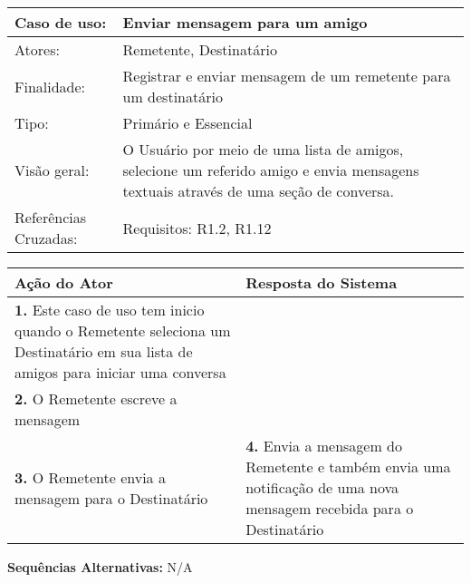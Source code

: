 \documentclass[12pt,a4paper,onecolumn,titlepage]{article}
\begin{document}
\begin{table}[h!]
\begin{center}
\begin{tabular}{p{2.5cm} p{9.5cm}}
Caso de uso: & \textbf{Enviar mensagem para um amigo} \\ \hline
Atores: & Remetente, Destinatário \\ \hline
Finalidade: & Registrar e enviar mensagem de um remetente para um destinatário\\ \hline
Tipo: & Primário e Essencial \\ \hline
Visão geral: & O Usuário por meio de uma lista de amigos, selecione um referido amigo e envia mensagens textuais através de uma seção de conversa. \\ \hline
Referências Cruzadas: & Requisitos: R1.2, R1.12\\

\end{tabular}
\end{center}
\end{table} 

\begin{center}
\def\arraystretch{1.1}
\begin{tabular}{|p{6cm}|p{6cm}|}

\hline
\textbf{Ação do Ator} & \textbf{Resposta do Sistema} \\ \hline
\textbf{1.} Este caso de uso tem inicio quando o Remetente seleciona um Destinatário em sua lista de amigos para iniciar uma conversa  &  \\ \hline
\textbf{2.} O Remetente escreve a mensagem  &   \\ \hline
\textbf{3.} O Remetente envia a mensagem para o Destinatário  &
\textbf{4.} Envia a mensagem do Remetente e também envia uma notificação de uma nova mensagem recebida para o Destinatário \\ \hline
\end{tabular}
\end{center}

\textbf{Sequências Alternativas:} N/A

\newpage
\end{document}
